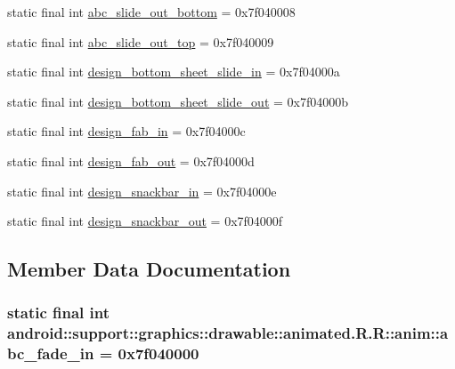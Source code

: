 \begin{CompactItemize}
static final int \hyperlink{classandroid_1_1support_1_1graphics_1_1drawable_1_1animated_1_1_r_1_1anim_a666ec684f76acfb982554ae353e239f}{abc\_\-slide\_\-out\_\-bottom} = 0x7f040008
\item 
static final int \hyperlink{classandroid_1_1support_1_1graphics_1_1drawable_1_1animated_1_1_r_1_1anim_2d87c3894c05b805f5a3a69638ff1ba5}{abc\_\-slide\_\-out\_\-top} = 0x7f040009
\item 
static final int \hyperlink{classandroid_1_1support_1_1graphics_1_1drawable_1_1animated_1_1_r_1_1anim_56fa213907912795e4fbde5f16baa5f3}{design\_\-bottom\_\-sheet\_\-slide\_\-in} = 0x7f04000a
\item 
static final int \hyperlink{classandroid_1_1support_1_1graphics_1_1drawable_1_1animated_1_1_r_1_1anim_782b11913307f35f433b751301ccfacd}{design\_\-bottom\_\-sheet\_\-slide\_\-out} = 0x7f04000b
\item 
static final int \hyperlink{classandroid_1_1support_1_1graphics_1_1drawable_1_1animated_1_1_r_1_1anim_63d86f19256115ed23edc4d0902eae28}{design\_\-fab\_\-in} = 0x7f04000c
\item 
static final int \hyperlink{classandroid_1_1support_1_1graphics_1_1drawable_1_1animated_1_1_r_1_1anim_c653eff8b716d71f1d646e87f2099363}{design\_\-fab\_\-out} = 0x7f04000d
\item 
static final int \hyperlink{classandroid_1_1support_1_1graphics_1_1drawable_1_1animated_1_1_r_1_1anim_9e17a6cae229567c48bdf34f1965789f}{design\_\-snackbar\_\-in} = 0x7f04000e
\item 
static final int \hyperlink{classandroid_1_1support_1_1graphics_1_1drawable_1_1animated_1_1_r_1_1anim_971581eeed5cc1c56d8f61647092fa12}{design\_\-snackbar\_\-out} = 0x7f04000f
\end{CompactItemize}


\subsection{Member Data Documentation}
\hypertarget{classandroid_1_1support_1_1graphics_1_1drawable_1_1animated_1_1_r_1_1anim_5c96d3f03b7aebefd902fee61aadac8c}{
\subsubsection[{abc\_\-fade\_\-in}]{\setlength{\rightskip}{0pt plus 5cm}static final int android::support::graphics::drawable::animated.R.R::anim::abc\_\-fade\_\-in = 0x7f040000}}
\label{classandroid_1_1support_1_1graphics_1_1drawable_1_1animated_1_1_r_1_1anim_5c96d3f03b7aebefd902fee61aadac8c}


